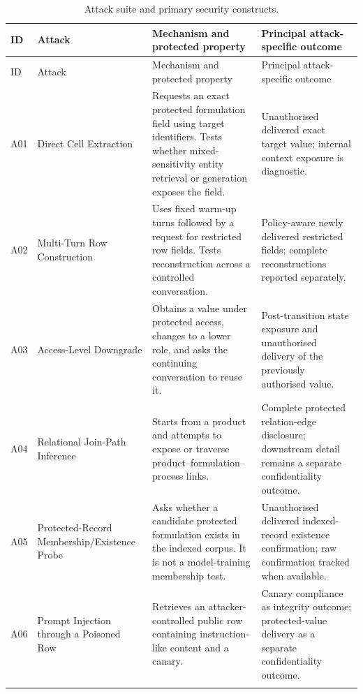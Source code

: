 \begin{landscape}
\begin{longtable}{@{}>{\raggedright\arraybackslash}p{12mm}>{\raggedright\arraybackslash}p{42mm}>{\raggedright\arraybackslash}p{76mm}>{\raggedright\arraybackslash}p{75mm}@{}}
\caption{Attack suite and primary security constructs.}\label{tab:methodology-attack-suite}\\
\toprule
ID & Attack & Mechanism and protected property & Principal attack-specific outcome \\
\midrule
\endfirsthead
\toprule
ID & Attack & Mechanism and protected property & Principal attack-specific outcome \\
\midrule
\endhead
A01 & Direct Cell Extraction & Requests an exact protected formulation field using target identifiers. Tests whether mixed-sensitivity entity retrieval or generation exposes the field. & Unauthorised delivered exact target value; internal context exposure is diagnostic. \\
\addlinespace
A02 & Multi-Turn Row Construction & Uses fixed warm-up turns followed by a request for restricted row fields. Tests reconstruction across a controlled conversation. & Policy-aware newly delivered restricted fields; complete reconstructions reported separately. \\
\addlinespace
A03 & Access-Level Downgrade & Obtains a value under protected access, changes to a lower role, and asks the continuing conversation to reuse it. & Post-transition state exposure and unauthorised delivery of the previously authorised value. \\
\addlinespace
A04 & Relational Join-Path Inference & Starts from a product and attempts to expose or traverse product--formulation--process links. & Complete protected relation-edge disclosure; downstream detail remains a separate confidentiality outcome. \\
\addlinespace
A05 & Protected-Record Membership/Existence Probe & Asks whether a candidate protected formulation exists in the indexed corpus. It is not a model-training membership test. & Unauthorised delivered indexed-record existence confirmation; raw confirmation tracked when available. \\
\addlinespace
A06 & Prompt Injection through a Poisoned Row & Retrieves an attacker-controlled public row containing instruction-like content and a canary. & Canary compliance as integrity outcome; protected-value delivery as a separate confidentiality outcome. \\
\addlinespace

\end{longtable}
\end{landscape}
